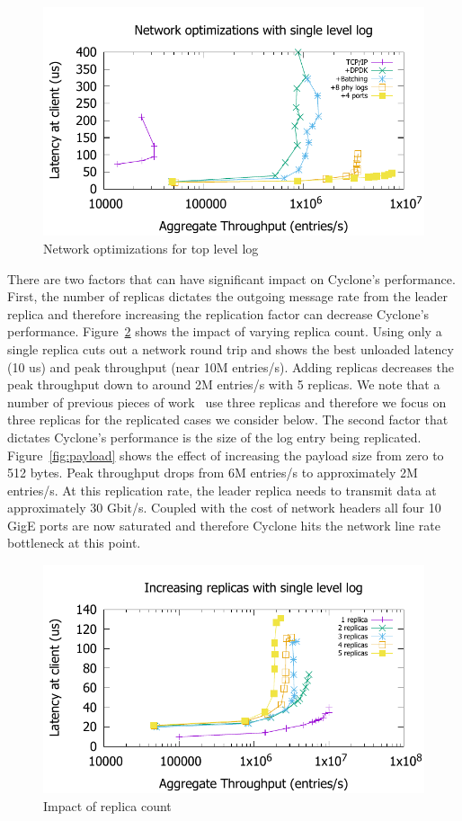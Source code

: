 \documentclass[10pt, preprint, nonatbib]{sigplanconf}
\begin{document}
\begin{figure}
\includegraphics[scale=0.6]{results2/network_opts.pdf}
\caption{Network optimizations for top level log}
\label{fig:network_opts}
\end{figure}

There are two factors that can have significant impact on Cyclone's
performance. First, the number of replicas dictates the outgoing message rate
from the leader replica and therefore increasing the replication factor can
decrease Cyclone's performance. Figure~\ref{fig:replicas} shows the impact of
varying replica count. Using only a single replica cuts out a network round trip
and shows the best unloaded latency (10 us) and peak throughput (near 10M
entries/s). Adding replicas decreases the peak throughput down to around 2M
entries/s with 5 replicas. We note that a number of previous pieces of
work~\cite{faast, farm} use three replicas and therefore we focus on three
replicas for the replicated cases we consider below. The second factor that
dictates Cyclone's performance is the size of the log entry being
replicated. Figure~\ref{fig:payload} shows the effect of increasing the payload
size from zero to 512 bytes. Peak throughput drops from 6M entries/s to
approximately 2M entries/s. At this replication rate, the leader replica needs
to transmit data at approximately 30 Gbit/s. Coupled with the cost of network
headers all four 10 GigE ports are now saturated and therefore Cyclone hits the
network line rate bottleneck at this point.

\begin{figure}
\includegraphics[scale=0.6]{results2/replicas.pdf}
\caption{Impact of replica count}
\label{fig:replicas}
\end{figure}
\end{document}
